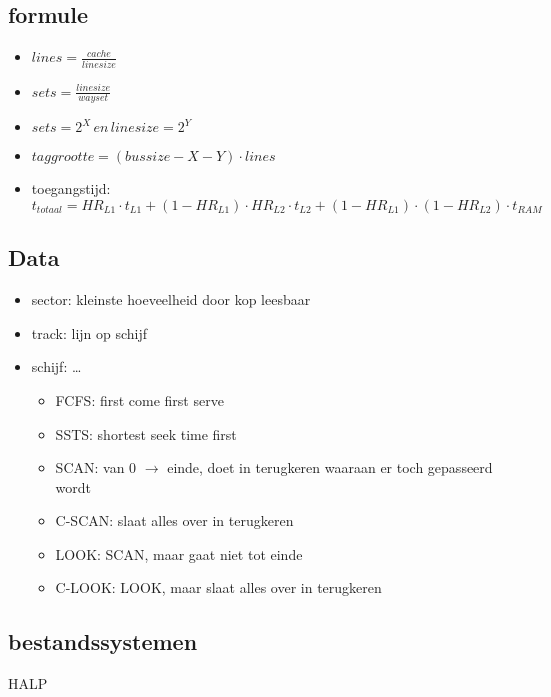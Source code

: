 \documentclass[11pt]{article}
\let\originalitem\item
\renewcommand{\item}{\originalitem[]}
\newcommand{\Newpage}{\end{preview}\begin{preview}}
\begin{document}
\begin{preview}
\subsection{formule}
\begin{itemize}
	\item $lines = \frac{cache}{linesize}$
	\item $sets = \frac{linesize}{wayset}$
	\item $sets = 2^X \, en \, linesize = 2^Y$
	\item $taggrootte = (bussize - X - Y) \cdot lines$
	\item toegangstijd: $t_{totaal} = HR_{L1} \cdot t_{L1} + (1 − HR_{L1}) \cdot HR_{L2} \cdot t_{L2} + (1 − HR_{L1}) \cdot (1 − HR_{L2}) \cdot t_{RAM} $
\end{itemize}


\Newpage

\section{Data}

\begin{itemize}
	\item sector: kleinste hoeveelheid door kop leesbaar
	\item track: lijn op schijf
	\item schijf: \dots
	\begin{itemize}
		\item FCFS: first come first serve
		\item SSTS: shortest seek time first
		\item SCAN: van 0 $\rightarrow$ einde, doet in terugkeren waaraan er toch gepasseerd wordt
		\item C-SCAN: slaat alles over in terugkeren
		\item LOOK: SCAN, maar gaat niet tot einde
		\item C-LOOK: LOOK, maar slaat alles over in terugkeren
	\end{itemize}
\end{itemize}

\subsection{bestandssystemen}

HALP %

\end{preview}
\end{document}
